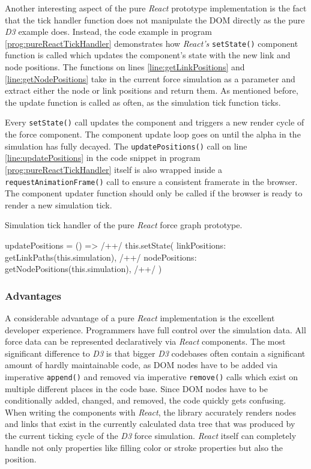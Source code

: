 Another interesting aspect of the pure \emph{React} prototype implementation is the fact that the tick handler function does not manipulate the DOM directly as the pure \emph{D3} example does. Instead, the code example in program \ref{prog:pureReactTickHandler} demonstrates how \emph{React's} \texttt{setState()} component function is called which updates the component's state with the new link and node positions. The functions on lines \ref{line:getLinkPositions} and \ref{line:getNodePositions} take in the current force simulation as a parameter and extract either the node or link positions and return them. As mentioned before, the update function is called as often, as the simulation tick function ticks. 

Every \texttt{setState()} call updates the component and triggers a new render cycle of the force component. The component update loop goes on until the alpha in the simulation has fully decayed. The \texttt{updatePositions()} call on line \ref{line:updatePositions} in the code snippet in program \ref{prog:pureReactTickHandler} itself is also wrapped inside a \texttt{requestAnimationFrame()} call to ensure a consistent framerate in the browser. The component updater function should only be called if the browser is ready to render a new simulation tick.

\begin{program}
\caption{Simulation tick handler of the pure \emph{React} force graph prototype.}
\label{prog:pureReactTickHandler}
\begin{JsCode}
updatePositions = () => { /+\label{line:updatePositions}+/
  this.setState({
    linkPositions: getLinkPaths(this.simulation), /+\label{line:getLinkPositions}+/
    nodePositions: getNodePositions(this.simulation), /+\label{line:getNodePositions}+/
  })
}
\end{JsCode}
\end{program}

\subsubsection{Advantages}


A considerable advantage of a pure \emph{React} implementation is the excellent developer experience. Programmers have full control over the simulation data. All force data can be represented declaratively via \emph{React} components. The most significant difference to \emph{D3} is that bigger \emph{D3} codebases often contain a significant amount of hardly maintainable code, as DOM nodes have to be added via imperative \texttt{append()} and removed via imperative \texttt{remove()} calls which exist on multiple different places in the code base. Since DOM nodes have to be conditionally added, changed, and removed, the code quickly gets confusing. When writing the components with \emph{React}, the library accurately renders nodes and links that exist in the currently calculated data tree that was produced by the current ticking cycle of the \emph{D3} force simulation. \emph{React} itself can completely handle not only properties like filling color or stroke properties but also the position.

